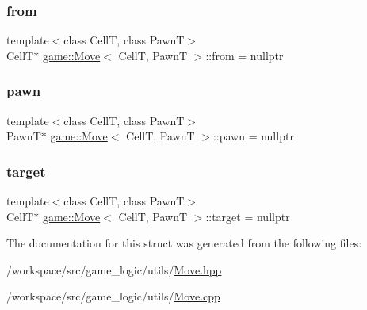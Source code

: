 \subsubsection{\texorpdfstring{from}{from}}
{\footnotesize\ttfamily template$<$class CellT, class PawnT$>$ \\
CellT$\ast$ \hyperlink{structgame_1_1_move}{game\+::\+Move}$<$ CellT, PawnT $>$\+::from = nullptr}

\mbox{\label{structgame_1_1_move_a085ad168dfef06addac771300768b984}} 
\subsubsection{\texorpdfstring{pawn}{pawn}}
{\footnotesize\ttfamily template$<$class CellT, class PawnT$>$ \\
PawnT$\ast$ \hyperlink{structgame_1_1_move}{game\+::\+Move}$<$ CellT, PawnT $>$\+::pawn = nullptr}

\mbox{\label{structgame_1_1_move_a046beb273056ca6a165a7f896e6a7637}} 
\subsubsection{\texorpdfstring{target}{target}}
{\footnotesize\ttfamily template$<$class CellT, class PawnT$>$ \\
CellT$\ast$ \hyperlink{structgame_1_1_move}{game\+::\+Move}$<$ CellT, PawnT $>$\+::target = nullptr}



The documentation for this struct was generated from the following files\+:\begin{DoxyCompactItemize}
\item 
/workspace/src/game\+\_\+logic/utils/\hyperlink{_move_8hpp}{Move.\+hpp}\item 
/workspace/src/game\+\_\+logic/utils/\hyperlink{_move_8cpp}{Move.\+cpp}\end{DoxyCompactItemize}

